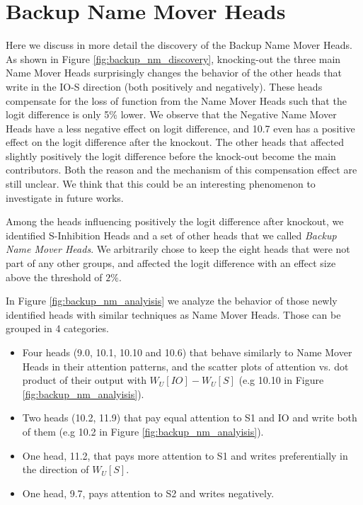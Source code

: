 \section{Backup Name Mover Heads} \label{app:backup_name_movers}

Here we discuss in more detail the discovery of the Backup Name Mover Heads. As shown in Figure \ref{fig:backup_nm_discovery}, knocking-out the three main Name Mover Heads surprisingly changes the behavior of the other heads that write in the IO-S direction (both positively and negatively). These heads compensate for the loss of function from the Name Mover Heads such that the logit difference is only 5\% lower. We observe that the Negative Name Mover Heads have a less negative effect on logit difference, and 10.7 even has a positive effect on the logit difference after the knockout. The other heads that affected slightly positively the logit difference before the knock-out become the main contributors. Both the reason and the mechanism of this compensation effect are still unclear. We think that this could be an interesting phenomenon to investigate in future works.

Among the heads influencing positively the logit difference after knockout, we identified S-Inhibition Heads and a set of other heads that we called \emph{Backup Name Mover Heads}. We arbitrarily chose to keep the eight heads that were not part of any other groups, and affected the logit difference with an effect size above the threshold of $2\%$. 

In Figure \ref{fig:backup_nm_analyisis} we analyze the behavior of those newly identified heads with similar techniques as Name Mover Heads. Those can be grouped in 4 categories.


\begin{itemize}
    \item Four heads (9.0, 10.1, 10.10 and 10.6) that behave similarly to Name Mover Heads in their attention patterns, and the scatter plots of attention vs. dot product of their output with $W_U[IO] - W_U[S]$ (e.g 10.10 in Figure \ref{fig:backup_nm_analyisis}).
    \item Two heads (10.2, 11.9) that pay equal attention to S1 and IO and write both of them (e.g 10.2 in Figure \ref{fig:backup_nm_analyisis}).
    \item One head, 11.2, that pays more attention to S1 and writes preferentially in the direction of $W_U[S]$.
    \item One head, 9.7, pays attention to S2 and writes negatively.
\end{itemize}

